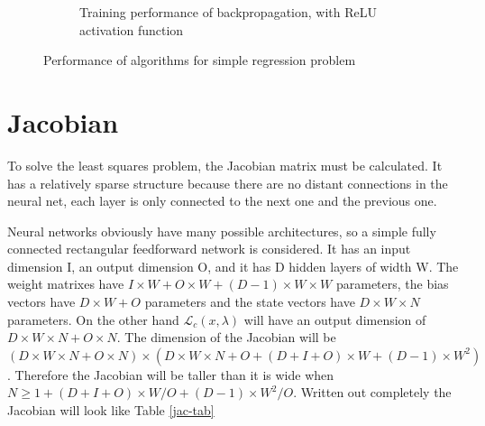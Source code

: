 \begin{figure}
\begin{subfigure}[b]{0.8\textwidth}
         \caption{Training performance of backpropagation, with ReLU activation function}
     \end{subfigure}
        \caption{Performance of algorithms for simple regression problem}
        \label{back-relu}
\end{figure}

\section{Jacobian}
To solve the least squares problem, the Jacobian matrix must be calculated. It has a relatively sparse structure because there are no distant connections in the neural net, each layer is only connected to the next one and the previous one.

Neural networks obviously have many possible architectures, so a simple fully connected rectangular feedforward network is considered. It has an input dimension I, an output dimension O, and it has D hidden layers of width W. The weight matrixes have $I\times W + O\times W + (D-1)\times W\times W$ parameters, the bias vectors have $D\times W+O$ parameters and the state vectors have $D\times W\times N$ parameters. On the other hand $\mathcal{L}_c(x,\lambda)$ will have an output dimension of $D\times W \times N + O\times N$. The dimension of the Jacobian will be $(D \times W\times N + O\times N)\times (D\times W\times N + O + (D+I+O)\times W + (D-1)\times W^2)$. Therefore the Jacobian will be taller than it is wide when $N \geq 1 + (D+I+O)\times W/O + (D-1)\times W^2/O$. Written out completely the Jacobian will look like Table \ref{jac-tab}


